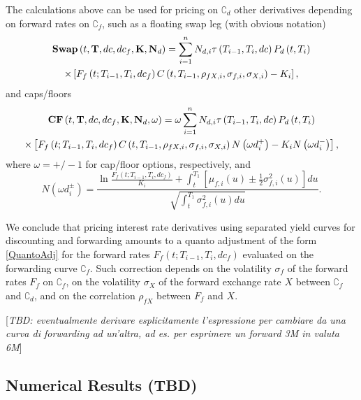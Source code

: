 \documentclass[11pt,reqno]{amsart}
\begin{document}
The calculations above can be used for pricing on $\complement _{d}$ other
derivatives depending on forward rates on $\complement _{f}$, such as a
floating swap leg (with obvious notation) 
\begin{multline}
\text{\textbf{Swap}}\left( t,\mathbf{T},dc,dc_{f},\mathbf{K},\mathbf{N}%
_{d}\right) =\sum\limits_{i=1}^{n}N_{d,i}\tau \left( T_{i-1},T_{i},dc\right)
P_{d}\left( t,T_{i}\right)  \notag \\
\times \left[ F_{f}\left( t;T_{i-1},T_{i},dc_{f}\right) C\left(
t,T_{i-1},\rho _{fX,i},\sigma _{f,i},\sigma _{X,i}\right) -K_{i}\right] ,
\end{multline}%
and caps/floors%
\begin{multline}
\text{\textbf{CF}}\left( t,\mathbf{T},dc,dc_{f},\mathbf{K},\mathbf{N}%
_{d},\omega \right) =\omega \sum\limits_{i=1}^{n}N_{d,i}\tau \left(
T_{i-1},T_{i},dc\right) P_{d}\left( t,T_{i}\right)  \notag \\
\times \left[ F_{f}\left( t;T_{i-1},T_{i},dc_{f}\right) C\left(
t,T_{i-1},\rho _{fX,i},\sigma _{f,i},\sigma _{X,i}\right) N\left( \omega
d_{i}^{+}\right) -K_{i}N\left( \omega d_{i}^{-}\right) \right] ,
\end{multline}%
where $\omega =+/-1$ for cap/floor options, respectively, and 
\begin{equation}
N\left( \omega d_{i}^{\pm }\right) =\frac{\ln \frac{F_{f}\left(
t;T_{i-1},T_{i},dc_{f}\right) }{K_{i}}+\int_{t}^{T_{1}}\left[ \mu
_{f,i}\left( u\right) \pm \frac{1}{2}\sigma _{f,i}^{2}\left( u\right) \right]
du}{\sqrt{\int_{t}^{T_{1}}\sigma _{f,i}^{2}\left( u\right) du}}.
\end{equation}

We conclude that pricing interest rate derivatives using separated yield
curves for discounting and forwarding amounts to a quanto adjustment of the
form \ref{QuantoAdj} for the forward rates $F_{f}\left(
t;T_{i-1},T_{i},dc_{f}\right) $ evaluated on the forwarding curve $%
\complement _{f}$. Such correction depends on the volatility $\sigma _{f}$
of the forward rates $F_{f}$ on $\complement _{f}$, on the volatility $%
\sigma _{X}$ of the forward exchange rate $X$ between $\complement _{f}$ and 
$\complement _{d}$, and on the correlation $\rho _{fX}$ between $F_{f}$ and $%
X$.

[\textit{TBD: eventualmente derivare esplicitamente l'espressione per
cambiare da una curva di forwarding ad un'altra, ad es. per esprimere un
forward 3M in valuta 6M}]

\subsection{Numerical Results (TBD)}
\end{document}
